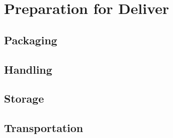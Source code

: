 \section{Preparation for Deliver}
\subsection{Packaging}
\subsubsection{}

\subsection{Handling}

\subsection{Storage}

\subsection{Transportation}

